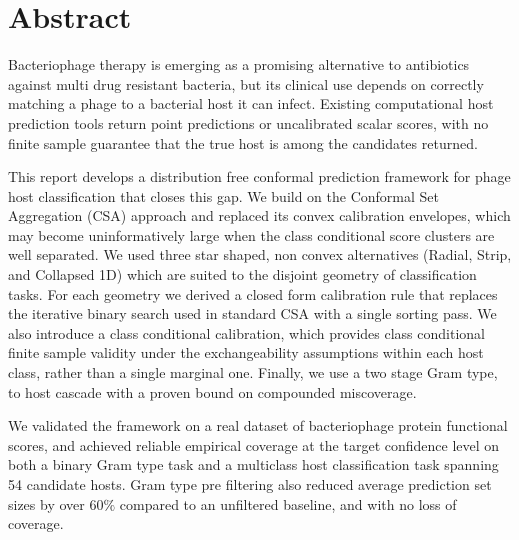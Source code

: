 \chapter*{Abstract}
\noindent
Bacteriophage therapy is emerging as a promising alternative to antibiotics against multi drug resistant bacteria,
but its clinical use depends on correctly matching a phage to a bacterial host it can infect. Existing computational
host prediction tools return point predictions or uncalibrated scalar scores, with no finite sample guarantee that
the true host is among the candidates returned.

This report develops a distribution free conformal prediction framework for phage host classification that closes
this gap. We build on the Conformal Set Aggregation (CSA) approach and replaced its convex calibration envelopes,
which may become uninformatively large when the class conditional score clusters are well separated. We used three star shaped,
non convex alternatives (Radial, Strip, and Collapsed 1D) which are suited to the disjoint geometry of classification
tasks. For each geometry we derived a closed form calibration rule that replaces the iterative binary search used in
standard CSA with a single sorting pass. We also introduce a class conditional calibration, which provides class conditional 
finite sample validity under the exchangeability assumptions within each host class, rather than a single marginal one. 
Finally, we use a two stage Gram type, to host cascade with a proven bound on compounded miscoverage.

We validated the framework on a real dataset of bacteriophage protein functional scores, and achieved reliable
empirical coverage at the target confidence level on both a binary Gram type task and a multiclass host
classification task spanning 54 candidate hosts. Gram type pre filtering also reduced average prediction set sizes
by over $60\%$ compared to an unfiltered baseline, and with no loss of coverage.

\vspace{0.3cm}






